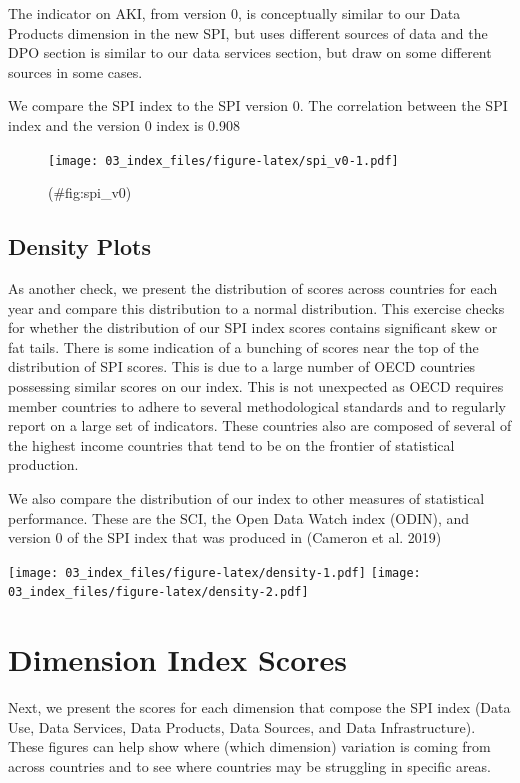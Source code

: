 \documentclass[
]{article}
\begin{document}
The indicator on AKI, from version 0, is conceptually similar to our Data Products dimension in the new SPI, but uses different sources of data and the DPO section is similar to our data services section, but draw on some different sources in some cases.

We compare the SPI index to the SPI version 0. The correlation between the SPI index and the version 0 index is 0.908

\begin{figure}
\centering
\texttt{[image: 03\_index\_files/figure-latex/spi\_v0-1.pdf]}
\caption{(\#fig:spi\_v0)~}
\end{figure}

\hypertarget{density-plots}{%
\subsection{Density Plots}\label{density-plots}}

As another check, we present the distribution of scores across countries for each year and compare this distribution to a normal distribution. This exercise checks for whether the distribution of our SPI index scores contains significant skew or fat tails. There is some indication of a bunching of scores near the top of the distribution of SPI scores. This is due to a large number of OECD countries possessing similar scores on our index. This is not unexpected as OECD requires member countries to adhere to several methodological standards and to regularly report on a large set of indicators. These countries also are composed of several of the highest income countries that tend to be on the frontier of statistical production.

We also compare the distribution of our index to other measures of statistical performance. These are the SCI, the Open Data Watch index (ODIN), and version 0 of the SPI index that was produced in (Cameron et al. 2019)

\texttt{[image: 03\_index\_files/figure-latex/density-1.pdf]} \texttt{[image: 03\_index\_files/figure-latex/density-2.pdf]}

\hypertarget{dimension-index-scores}{%
\section{Dimension Index Scores}\label{dimension-index-scores}}

Next, we present the scores for each dimension that compose the SPI index (Data Use, Data Services, Data Products, Data Sources, and Data Infrastructure). These figures can help show where (which dimension) variation is coming from across countries and to see where countries may be struggling in specific areas.
\end{document}
